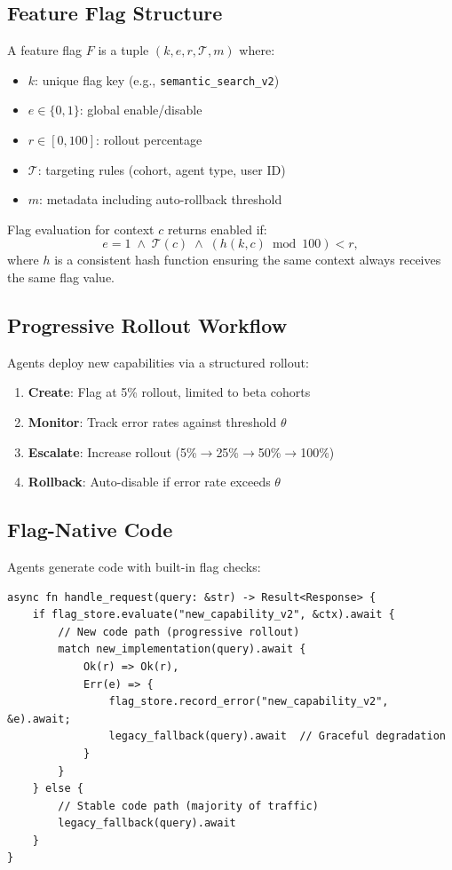 \documentclass[11pt]{article}
\begin{document}
\subsection{Feature Flag Structure}

A feature flag $F$ is a tuple $(k, e, r, \mathcal{T}, m)$ where:
\begin{itemize}[noitemsep,topsep=4pt]
  \item $k$: unique flag key (e.g., \texttt{semantic\_search\_v2})
  \item $e \in \{0,1\}$: global enable/disable
  \item $r \in [0,100]$: rollout percentage
  \item $\mathcal{T}$: targeting rules (cohort, agent type, user ID)
  \item $m$: metadata including auto-rollback threshold
\end{itemize}

Flag evaluation for context $c$ returns enabled if:
\begin{equation}
  e = 1 \;\wedge\; \mathcal{T}(c) \;\wedge\; (h(k,c) \bmod 100) < r,
\end{equation}
where $h$ is a consistent hash function ensuring the same context always
receives the same flag value.

\subsection{Progressive Rollout Workflow}

Agents deploy new capabilities via a structured rollout:
\begin{enumerate}[noitemsep,topsep=4pt]
  \item \textbf{Create}: Flag at 5\% rollout, limited to beta cohorts
  \item \textbf{Monitor}: Track error rates against threshold $\theta$
  \item \textbf{Escalate}: Increase rollout (5\%$\rightarrow$25\%$\rightarrow$50\%$\rightarrow$100\%)
  \item \textbf{Rollback}: Auto-disable if error rate exceeds $\theta$
\end{enumerate}

\subsection{Flag-Native Code}

Agents generate code with built-in flag checks:
\begin{lstlisting}
async fn handle_request(query: &str) -> Result<Response> {
    if flag_store.evaluate("new_capability_v2", &ctx).await {
        // New code path (progressive rollout)
        match new_implementation(query).await {
            Ok(r) => Ok(r),
            Err(e) => {
                flag_store.record_error("new_capability_v2", &e).await;
                legacy_fallback(query).await  // Graceful degradation
            }
        }
    } else {
        // Stable code path (majority of traffic)
        legacy_fallback(query).await
    }
}
\end{lstlisting}
\end{document}
